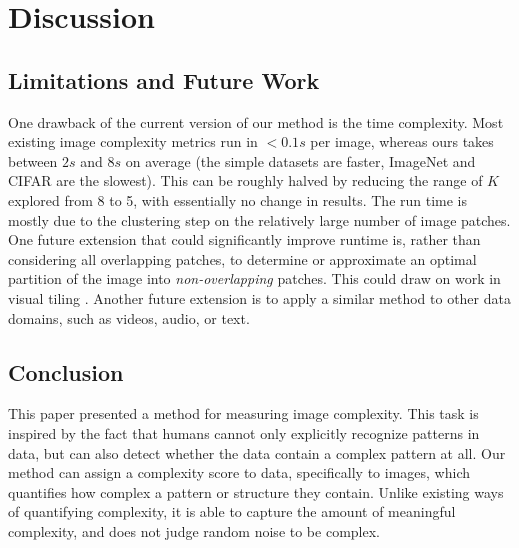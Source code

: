 \documentclass[a4paper,fleqn]{cas-sc}
\theoremstyle{remark}
\begin{document}
\section{Discussion} \label{sec:conclusion}
\subsection{Limitations and Future Work}
One drawback of the current version of our method is the time complexity. Most existing image complexity metrics run in $<0.1s$ per image, whereas ours takes between $2s$ and $8s$ on average (the simple datasets are faster, ImageNet and CIFAR are the slowest). This can be roughly halved by reducing the range of $K$ explored from 8 to 5, with essentially no change in results. The run time is mostly due to the clustering step on the relatively large number of image patches. One future extension that could significantly improve runtime is, rather than considering all overlapping patches, to determine or approximate an optimal partition of the image into \emph{non-overlapping} patches. This could draw on work in visual tiling \citep{xiao2017optile}. Another future extension is to apply a similar method to other data domains, such as videos, audio, or text.

\subsection{Conclusion}
This paper presented a method for measuring image complexity. %
This task is inspired by the fact that humans cannot only explicitly recognize patterns in data, but can also detect whether the data contain a complex pattern at all. Our method can assign a complexity score to data, specifically to images, which quantifies how complex a pattern or structure they contain. Unlike existing ways of quantifying complexity, it is able to capture the amount of meaningful complexity, and does not judge random noise to be complex.   %
 
\end{document}
